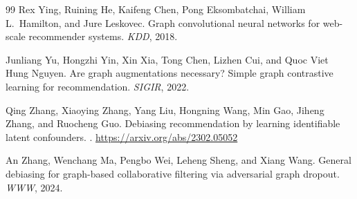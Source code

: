 {\begin{thebibliography}{99}
Rex Ying, Ruining He, Kaifeng Chen, Pong Eksombatchai, William L.\ Hamilton, and Jure Leskovec.
\newblock Graph convolutional neural networks for web-scale recommender systems.
\newblock \emph{KDD}, 2018.

Junliang Yu, Hongzhi Yin, Xin Xia, Tong Chen, Lizhen Cui, and Quoc Viet Hung Nguyen.
\newblock Are graph augmentations necessary? Simple graph contrastive learning for recommendation.
\newblock \emph{SIGIR}, 2022.

Qing Zhang, Xiaoying Zhang, Yang Liu, Hongning Wang, Min Gao, Jiheng Zhang, and Ruocheng Guo.
\newblock Debiasing recommendation by learning identifiable latent confounders.
.
\newblock \url{https://arxiv.org/abs/2302.05052}

An Zhang, Wenchang Ma, Pengbo Wei, Leheng Sheng, and Xiang Wang.
\newblock General debiasing for graph-based collaborative filtering via adversarial graph dropout.
\newblock \emph{WWW}, 2024.

\end{thebibliography}
}
